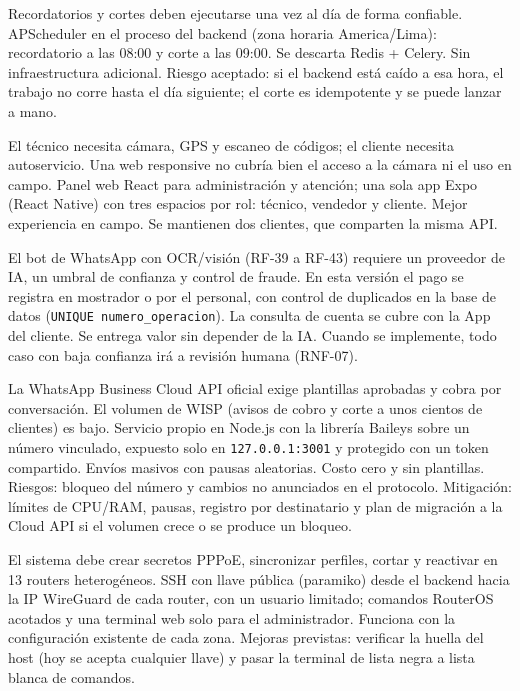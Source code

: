{Recordatorios y cortes deben ejecutarse una vez al día de forma confiable.}
{APScheduler en el proceso del backend (zona horaria America/Lima): recordatorio a las 08:00 y corte a las 09:00. Se descarta Redis + Celery.}
{Sin infraestructura adicional. Riesgo aceptado: si el backend está caído a esa hora, el trabajo no corre hasta el día siguiente; el corte es idempotente y se puede lanzar a mano.}

{El técnico necesita cámara, GPS y escaneo de códigos; el cliente necesita autoservicio. Una web responsive no cubría bien el acceso a la cámara ni el uso en campo.}
{Panel web React para administración y atención; una sola app Expo (React Native) con tres espacios por rol: técnico, vendedor y cliente.}
{Mejor experiencia en campo. Se mantienen dos clientes, que comparten la misma API.}

{El bot de WhatsApp con OCR/visión (RF-39 a RF-43) requiere un proveedor de IA, un umbral de confianza y control de fraude.}
{En esta versión el pago se registra en mostrador o por el personal, con control de duplicados en la base de datos (\texttt{UNIQUE numero\_operacion}). La consulta de cuenta se cubre con la App del cliente.}
{Se entrega valor sin depender de la IA. Cuando se implemente, todo caso con baja confianza irá a revisión humana (RNF-07).}

{La WhatsApp Business Cloud API oficial exige plantillas aprobadas y cobra por conversación. El volumen de WISP (avisos de cobro y corte a unos cientos de clientes) es bajo.}
{Servicio propio en Node.js con la librería Baileys sobre un número vinculado, expuesto solo en \texttt{127.0.0.1:3001} y protegido con un token compartido. Envíos masivos con pausas aleatorias.}
{Costo cero y sin plantillas. Riesgos: bloqueo del número y cambios no anunciados en el protocolo. Mitigación: límites de CPU/RAM, pausas, registro por destinatario y plan de migración a la Cloud API si el volumen crece o se produce un bloqueo.}

{El sistema debe crear secretos PPPoE, sincronizar perfiles, cortar y reactivar en 13 routers heterogéneos.}
{SSH con llave pública (paramiko) desde el backend hacia la IP WireGuard de cada router, con un usuario limitado; comandos RouterOS acotados y una terminal web solo para el administrador.}
{Funciona con la configuración existente de cada zona. Mejoras previstas: verificar la huella del host (hoy se acepta cualquier llave) y pasar la terminal de lista negra a lista blanca de comandos.}

